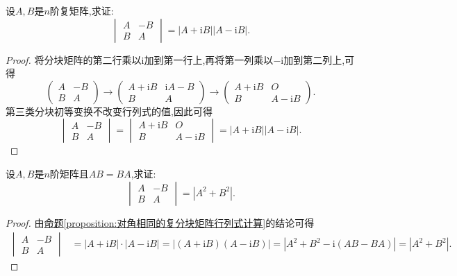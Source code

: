 \documentclass[../../main.tex]{subfiles}%
\begin{document}
\begin{proposition}\label{proposition:对角相同的复分块矩阵行列式计算}
设\(A,B\)是\(n\)阶复矩阵,求证:
\[
\begin{vmatrix}
A & -B\\
B & A
\end{vmatrix}=|A + \mathrm{i}B||A - \mathrm{i}B|.
\]
\end{proposition}
\begin{proof}

将分块矩阵的第二行乘以\(\mathrm{i}\)加到第一行上,再将第一列乘以\(-\mathrm{i}\)加到第二列上,可得
\[
\begin{pmatrix}
A & -B\\
B & A
\end{pmatrix}\to\begin{pmatrix}
A + \mathrm{i}B & \mathrm{i}A - B\\
B & A
\end{pmatrix}\to\begin{pmatrix}
A + \mathrm{i}B & O\\
B & A - \mathrm{i}B
\end{pmatrix}.
\]
第三类分块初等变换不改变行列式的值,因此可得
\[
\begin{vmatrix}
A & -B\\
B & A
\end{vmatrix}=\begin{vmatrix}
A + \mathrm{i}B & O\\
B & A - \mathrm{i}B
\end{vmatrix}=|A + \mathrm{i}B||A - \mathrm{i}B|.
\]

\end{proof}

\begin{example}\label{example:2.28}
设\(A,B\)是\(n\)阶矩阵且\(AB = BA\),求证:
\[
\begin{vmatrix}
A & -B\\
B & A
\end{vmatrix}=|A^2 + B^2|.
\]
\end{example}
\begin{proof}

由\hyperref[proposition:对角相同的复分块矩阵行列式计算]{命题\ref{proposition:对角相同的复分块矩阵行列式计算}}的结论可得
\begin{align*}
\begin{vmatrix}
A & -B\\
B & A
\end{vmatrix}&=|A + \mathrm{i}B|\cdot|A - \mathrm{i}B|
=|(A + \mathrm{i}B)(A - \mathrm{i}B)|
=|A^2 + B^2 - \mathrm{i}(AB - BA)|
=|A^2 + B^2|.
\end{align*}

\end{proof}
\end{document}
